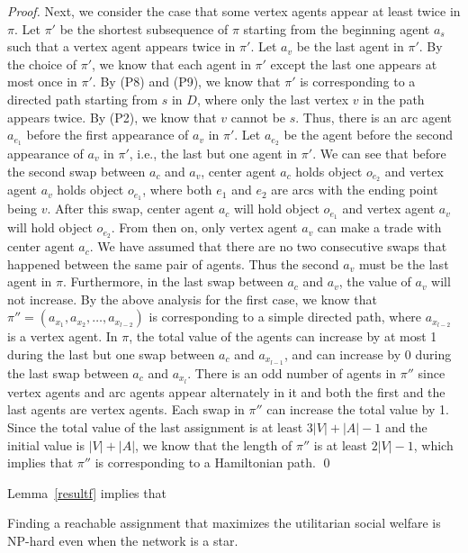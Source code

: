 \begin{proof}
Next, we consider the case that some vertex agents appear at least twice in $\pi$.
 Let $\pi'$ be the shortest subsequence of $\pi$ starting from the beginning agent $a_s$ such that a vertex agent appears twice in $\pi'$. Let $a_v$ be the last agent in $\pi'$.
 By the choice of $\pi'$, we know that
  each agent in $\pi'$ except the last one appears at most once in $\pi'$. By (P8) and (P9), we know that $\pi'$ is corresponding to a directed path starting from $s$ in $D$, where only the last vertex $v$ in the path appears twice.  By (P2), we know that $v$ cannot be $s$. Thus, there is
  an arc agent $a_{e_1}$ before the first appearance of $a_v$ in $\pi'$. Let $a_{e_2}$ be the agent before the second appearance of $a_v$ in $\pi'$, i.e., the last but one agent in $\pi'$. We can see that before the second swap between $a_c$ and $a_v$, center agent $a_c$ holds object $o_{e_2}$ and vertex agent $a_v$ holds object $o_{e_1}$,
  where both $e_1$ and $e_2$ are arcs with the ending point being $v$.
   After this swap, center
  agent $a_c$ will hold object $o_{e_1}$ and vertex agent $a_v$ will hold object $o_{e_2}$. From then on, only vertex agent $a_{v}$
  can make a trade with center agent $a_c$. We have assumed that there are no two consecutive swaps that happened between the same pair of agents. Thus the second $a_v$ must be the last agent in $\pi$. Furthermore, in the last swap between $a_c$ and $a_v$, the value of
  $a_v$ will not increase. By the above analysis for the first case,
  we know that $\pi''=(a_{x_1},a_{x_2}, \dots, a_{x_{l-2}})$ is corresponding to a simple directed path, where $a_{x_{l-2}}$ is a vertex agent. In $\pi$, the total value of the agents
  can increase by at most 1 during the last but one swap between $a_c$ and $a_{x_{l-1}}$, and can increase by 0 during the last swap between $a_c$ and $a_{x_{l}}$. There is an odd number of agents in $\pi''$ since vertex agents and arc agents appear alternately in it and both the first and the last agents are vertex agents. Each swap in $\pi''$ can increase the total value by 1. Since the total value of the last assignment is at least $3|V|+|A|-1$ and the initial value is $|V|+|A|$, we know that the length of $\pi''$ is at least $2|V|-1$, which implies that $\pi''$ is corresponding to a Hamiltonian path.
    \qed
\end{proof}
Lemma~\ref{resultf} implies that


\begin{theorem}
    \label{the_sv_star}
    Finding a reachable assignment that maximizes the utilitarian social welfare is NP-hard even when the network is a star.
\end{theorem}

